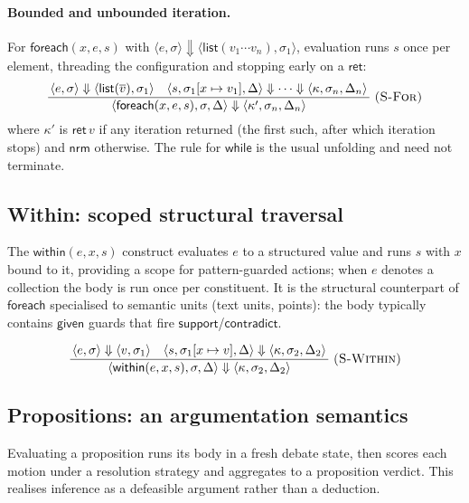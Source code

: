 \documentclass[11pt,a4paper]{article}
\theoremstyle{plain}
\theoremstyle{definition}
\theoremstyle{remark}
\newcommand{\rn}[1]{\textsc{#1}}                          %
\newcommand{\evalto}{\Downarrow}
\newcommand{\env}{\sigma}
\newcommand{\nrm}{\mathsf{nrm}}
\newcommand{\ret}{\mathsf{ret}}
\newcommand{\infrule}[3]{%
  \ensuremath{\displaystyle\frac{\,#2\,}{\,#3\,}}\;\rn{(#1)}}
\begin{document}
\paragraph{Bounded and unbounded iteration.}
For $\mathsf{foreach}(x,e,s)$ with $\langle e,\env\rangle\evalto\langle
\mathsf{list}(v_1\cdots v_n),\env_1\rangle$, evaluation runs $s$ once per
element, threading the configuration and stopping early on a $\ret$:
\[
\infrule{S-For}{\langle e,\env\rangle\evalto\langle\mathsf{list}(\overline{v}),
                \env_1\rangle\quad
                \langle s, \env_1[x\mapsto v_1],\Delta\rangle\evalto\cdots
                \evalto\langle\kappa,\env_n,\Delta_n\rangle}
               {\langle\mathsf{foreach}(x,e,s),\env,\Delta\rangle\evalto
                \langle\kappa',\env_n,\Delta_n\rangle}
\]
where $\kappa'$ is $\ret\,v$ if any iteration returned (the first such, after
which iteration stops) and $\nrm$ otherwise. The rule for $\mathsf{while}$ is
the usual unfolding and need not terminate.

\subsection{Within: scoped structural traversal}

The $\mathsf{within}(e,x,s)$ construct evaluates $e$ to a structured value and
runs $s$ with $x$ bound to it, providing a scope for pattern-guarded actions;
when $e$ denotes a collection the body is run once per constituent. It is the
structural counterpart of $\mathsf{foreach}$ specialised to semantic units
(text units, points): the body typically contains $\mathsf{given}$ guards that
fire $\mathsf{support}$/$\mathsf{contradict}$.

\[
\infrule{S-Within}{\langle e,\env\rangle\evalto\langle v,\env_1\rangle\quad
                   \langle s,\env_1[x\mapsto v],\Delta\rangle\evalto
                   \langle\kappa,\env_2,\Delta_2\rangle}
                  {\langle\mathsf{within}(e,x,s),\env,\Delta\rangle\evalto
                   \langle\kappa,\env_2,\Delta_2\rangle}
\]

\subsection{Propositions: an argumentation semantics}
\label{sec:propsem}

Evaluating a proposition runs its body in a fresh debate state, then scores each
motion under a resolution strategy and aggregates to a proposition verdict. This
realises inference as a defeasible argument \citep{toulmin1958,dung1995,
besnard2008} rather than a deduction.
\end{document}
